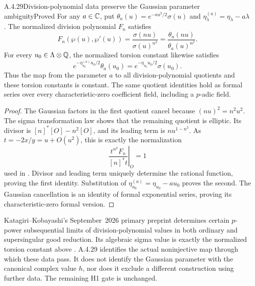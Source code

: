 \begin{result}{A.4.29}{Division-polynomial data preserve the Gaussian parameter ambiguity}{Proved}
For any $a\in\mathbb C$, put $\theta_a(u)=e^{-au^2/2}\sigma(u)$ and
$\eta^{(a)}_\lambda=\eta_\lambda-a\lambda$. The normalized division polynomial $F_n$ satisfies
\[
 F_n(\wp(u),\wp'(u))
 =\frac{\sigma(nu)}{\sigma(u)^{n^2}}
 =\frac{\theta_a(nu)}{\theta_a(u)^{n^2}}.
\]
For every $u_0\in\Lambda\otimes\mathbb Q$, the normalized torsion constant likewise satisfies
\[
 e^{-\eta^{(a)}_{u_0}u_0/2}\theta_a(u_0)
 =e^{-\eta_{u_0}u_0/2}\sigma(u_0).
\]
Thus the map from the parameter $a$ to all division-polynomial quotients and these torsion constants is constant. The same quotient identities hold as formal series over every characteristic-zero coefficient field, including a $p$-adic field.
\end{result}
\begin{proof}
The Gaussian factors in the first quotient cancel because $(nu)^2=n^2u^2$. The sigma transformation law shows that the remaining quotient is elliptic. Its divisor is $[n]^*[O]-n^2[O]$, and its leading term is $n u^{1-n^2}$. As $t=-2x/y=u+O(u^2)$, this is exactly the normalization
\[
 \left.\frac{t^{n^2}F_n}{[n]^*t}\right|_O=1
\]
used in \cite[p.2]{EllKatagiriKobayashi2026}. Divisor and leading term uniquely determine the rational function, proving the first identity. Substitution of $\eta^{(a)}_{u_0}=\eta_{u_0}-au_0$ proves the second. The Gaussian cancellation is an identity of formal exponential series, proving its characteristic-zero formal version.
\end{proof}

Katagiri--Kobayashi's September~2026 primary preprint \cite[Theorem 1.3 and Corollary 1.4, pp.3--4]{EllKatagiriKobayashi2026} determines certain $p$-power subsequential limits of division-polynomial values in both ordinary and supersingular good reduction. Its algebraic sigma value is exactly the normalized torsion constant above \cite[Definition 2.3, Proposition 2.5, and Theorem 2.7, pp.6--7]{EllKatagiriKobayashi2026}. A.4.29 identifies the actual noninjective map through which these data pass. It does not identify the Gaussian parameter with the canonical complex value $h$, nor does it exclude a different construction using further data. The remaining H1 gate is unchanged.

